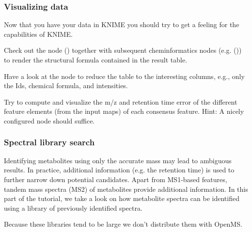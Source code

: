 \subsubsection{Visualizing data}

Now that you have your data in KNIME you should try to get a feeling for the capabilities of KNIME.

\begin{task}
Check out the   node () together with subsequent cheminformatics nodes (e.g.  ()) to render the structural formula contained in the result table.

\end{task}
\begin{task}
Have a look at the  node to reduce the table to the interesting columns, e.g., only the Ids, chemical formula, and intensities.
\end{task}
\begin{task}
Try to compute and visualize the m/z and retention time error of the different feature elements (from the input maps) of each consensus feature. Hint: A nicely configured  node should suffice.
\end{task}

\subsubsection{Spectral library search}

Identifying metabolites using only the accurate mass may lead to ambiguous results. In practice, additional information (e.g. the retention time) is used to further narrow down potential candidates. Apart from MS1-based features, tandem mass spectra (MS2) of metabolites provide additional information.
In this part of the tutorial, we take a look on how metabolite spectra can be identified using a library of previously identified spectra.

\noindent Because these libraries tend to be large we don't distribute them with OpenMS. 

